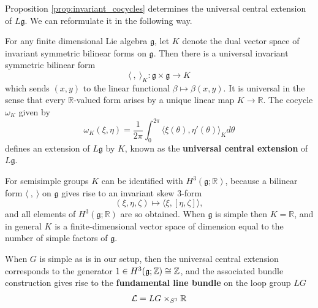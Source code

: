\documentclass[12pt]{article}
\begin{document}
Proposition \ref{prop:invariant_cocycles} determines the universal central extension of $L\mathfrak{g}$.
We can reformulate it in the following way. 

For any finite dimensional Lie algebra $\mathfrak{g}$, let $K$ denote the dual vector space of invariant symmetric bilinear forms on $\mathfrak{g}$. Then there is a universal invariant symmetric bilinear form
\begin{equation} \label{eq:4.2.6}
    \langle \ , \ \rangle_K : \mathfrak{g} \times \mathfrak{g} \to K
\end{equation} which sends $(x,y)$ to the linear functional $\beta \mapsto \beta(x,y)$. It is universal in the sense that every $\mathbb{R}$-valued form arises by a unique linear map $K \to \mathbb{R}$. The cocycle $\omega_K$ given by
\begin{equation} \label{eq:4.2.7}
    \omega_K(\xi,\eta) = \frac{1}{2\pi} \int_0^{2\pi}
    \langle \xi(\theta), \eta'(\theta)\rangle_K  d\theta
\end{equation}
defines an extension of $L\mathfrak{g}$ by $K$, known as the \textbf{universal central extension} of $L\mathfrak{g}$.

For semisimple groups $K$ can be identified with $H^3(\mathfrak{g};\mathbb{R})$,
because a bilinear form $\langle \ , \ \rangle$ on $\mathfrak{g}$ gives rise to an
invariant skew $3$-form
\[
    (\xi,\eta,\zeta) \mapsto \langle \xi,[\eta,\zeta]\rangle,
\]
and all elements of $H^3(\mathfrak{g};\mathbb{R})$ are so obtained. When $\mathfrak{g}$ is simple then $K = \mathbb{R}$, and in general $K$ is a finite-dimensional vector space of dimension equal to the number of simple factors of $\mathfrak{g}$.

When $G$ is simple as is in our setup, then the universal central extension corresponds to the generator $1\in H^3(\mathfrak{g};\mathbb{Z}) \cong \mathbb{Z}$, and the associated bundle construction gives rise to the \textbf{fundamental line bundle} on the loop group $LG$ \begin{align*}
    {\mathcal{L}} = LG \times_{S^1} \mathbb{R}
\end{align*} 
\end{document}

